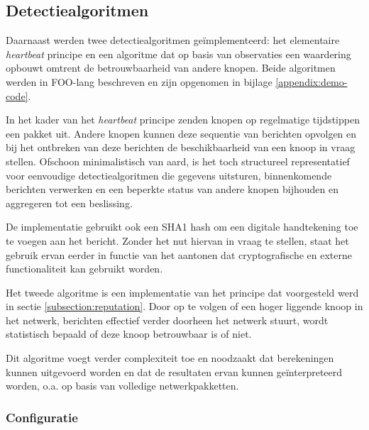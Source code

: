 \subsection{Detectiealgoritmen}
\label{subsection:eval-algorithms}

Daarnaast werden twee detectiealgoritmen ge\"implementeerd: het elementaire
\emph{heartbeat} principe en een algoritme dat op basis van observaties een
waardering opbouwt omtrent de betrouwbaarheid van andere knopen. Beide
algoritmen werden in FOO-lang beschreven en zijn opgenomen in bijlage
\ref{appendix:demo-code}.

\begin{description}[noitemsep, topsep=0pt, partopsep=1pt]

  \item[Heartbeat] In het kader van het \emph{heartbeat} principe zenden knopen
  op regelmatige tijdstippen een pakket uit. Andere knopen kunnen deze
  sequentie van berichten opvolgen en bij het ontbreken van deze berichten de
  beschikbaarheid van een knoop in vraag stellen. Ofschoon minimalistisch van
  aard, is het toch structureel representatief voor eenvoudige
  detectiealgoritmen die gegevens uitsturen, binnenkomende berichten verwerken
  en een beperkte status van andere knopen bijhouden en aggregeren tot een
  beslissing.

  De implementatie gebruikt ook een SHA1 hash \citep{rfc:3174} om een digitale
  handtekening toe te voegen aan het bericht. Zonder het nut hiervan in vraag
  te stellen, staat het gebruik ervan eerder in functie van het aantonen dat
  cryptografische en externe functionaliteit kan gebruikt worden.

  \item[Reputatie] Het tweede algoritme is een implementatie van het principe
  dat voorgesteld werd in sectie \ref{subsection:reputation}. Door op te volgen
  of een hoger liggende knoop in het netwerk, berichten effectief verder
  doorheen het netwerk stuurt, wordt statistisch bepaald of deze knoop
  betrouwbaar is of niet.

  Dit algoritme voegt verder complexiteit toe en noodzaakt dat berekeningen
  kunnen uitgevoerd worden en dat de resultaten ervan kunnen ge\"interpreteerd
  worden, o.a. op basis van volledige netwerkpakketten.

\end{description}

\vspace{-3mm}

\subsubsection{Configuratie}

